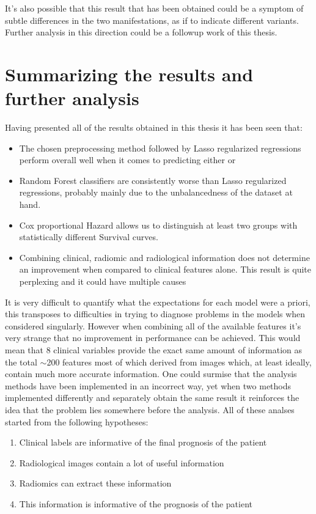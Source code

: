 It's also possible that this result that has been obtained could be a symptom of subtle differences in the two \covid manifestations, as if to indicate different variants.
Further analysis in this direction could be a followup work of this thesis.

\section{Summarizing the results and further analysis}
Having presented all of the results obtained in this thesis it has been seen that:

\begin{itemize}
\item The chosen preprocessing method followed by Lasso regularized regressions perform overall well when it comes to predicting either \death or \icu
\item Random Forest classifiers are consistently worse than Lasso regularized regressions, probably mainly due to the unbalancedness of the dataset at hand.
\item Cox proportional Hazard allows us to distinguish at least two groups with statistically different Survival curves.
\item Combining clinical, radiomic and radiological information does not determine an improvement when compared to clinical features alone.
This result is quite perplexing and it could have multiple causes
\end{itemize}

It is very difficult to quantify what the expectations for each model were a priori, this transposes to difficulties in trying to diagnose problems in the models when considered singularly. However when combining all of the available features it's very strange that no improvement in performance can be achieved.
This would mean that 8 clinical variables provide the exact same amount of information as the total $\sim$200 features most of which derived from images which, at least ideally, contain much more accurate information. 
One could surmise that the analysis methods have been implemented in an incorrect way, yet when two methods implemented differently and separately obtain the same result it reinforces the idea that the problem lies somewhere before the analysis.
 All of these analses started from the following hypotheses:

\begin{enumerate}
\item Clinical labels are informative of the final prognosis of the patient
\item Radiological images contain a lot of useful information
\item Radiomics can extract these information
\item This information is informative of the prognosis of the patient
\end{enumerate}

